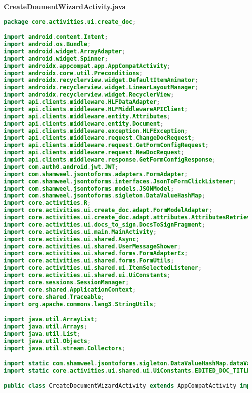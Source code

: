 \textbf{CreateDoumentWizardActivity.java}
\begin{lstlisting}[language=Java]
package core.activities.ui.create_doc;

import android.content.Intent;
import android.os.Bundle;
import android.widget.ArrayAdapter;
import android.widget.Spinner;
import androidx.appcompat.app.AppCompatActivity;
import androidx.core.util.Preconditions;
import androidx.recyclerview.widget.DefaultItemAnimator;
import androidx.recyclerview.widget.LinearLayoutManager;
import androidx.recyclerview.widget.RecyclerView;
import api.clients.middleware.HLFDataAdapter;
import api.clients.middleware.HLFMiddlewareAPIClient;
import api.clients.middleware.entity.Attributes;
import api.clients.middleware.entity.Document;
import api.clients.middleware.exception.HLFException;
import api.clients.middleware.request.ChangeDocRequest;
import api.clients.middleware.request.GetFormConfigRequest;
import api.clients.middleware.request.NewDocRequest;
import api.clients.middleware.response.GetFormConfigResponse;
import com.auth0.android.jwt.JWT;
import com.shamweel.jsontoforms.adapters.FormAdapter;
import com.shamweel.jsontoforms.interfaces.JsonToFormClickListener;
import com.shamweel.jsontoforms.models.JSONModel;
import com.shamweel.jsontoforms.sigleton.DataValueHashMap;
import core.activities.R;
import core.activities.ui.create_doc.adapt.FormModelAdapter;
import core.activities.ui.create_doc.adapt.attributes.AttributesRetriever;
import core.activities.ui.docs_to_sign.DocsToSignFragment;
import core.activities.ui.main.MainActivity;
import core.activities.ui.shared.Async;
import core.activities.ui.shared.UserMessageShower;
import core.activities.ui.shared.forms.FormAdapterEx;
import core.activities.ui.shared.forms.FormUtils;
import core.activities.ui.shared.ui.ItemSelectedListener;
import core.activities.ui.shared.ui.UiConstants;
import core.sessions.SessionManager;
import core.shared.ApplicationContext;
import core.shared.Traceable;
import org.apache.commons.lang3.StringUtils;

import java.util.ArrayList;
import java.util.Arrays;
import java.util.List;
import java.util.Objects;
import java.util.stream.Collectors;

import static com.shamweel.jsontoforms.sigleton.DataValueHashMap.dataValueHashMap;
import static core.activities.ui.shared.ui.UiConstants.EDITED_DOC_TITLE_EXTRA;

public class CreateDocumentWizardActivity extends AppCompatActivity implements UserMessageShower, Traceable, JsonToFormClickListener {
	

\end{lstlisting}
